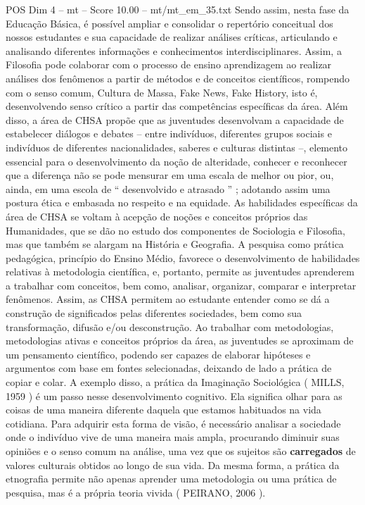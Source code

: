 \begin{textsample}{POS Dim 4 – mt – Score 10.00 – mt/mt\_em\_35.txt}
Sendo assim, nesta fase da Educação Básica, é possível ampliar e consolidar o repertório conceitual dos nossos estudantes e sua capacidade de realizar análises críticas, articulando e analisando diferentes informações e conhecimentos interdisciplinares.
Assim, a Filosofia pode colaborar com o processo de ensino aprendizagem ao realizar análises dos fenômenos a partir de métodos e de conceitos científicos, rompendo com o senso comum, Cultura de Massa, Fake News, Fake History, isto é, desenvolvendo senso crítico a partir das competências específicas da área.
Além disso, a área de CHSA propõe que as juventudes desenvolvam a capacidade de estabelecer diálogos e debates – entre indivíduos, diferentes grupos sociais e indivíduos de diferentes nacionalidades, saberes e culturas distintas –, elemento essencial para o desenvolvimento da noção de alteridade, conhecer e reconhecer que a diferença não se pode mensurar em uma escala de melhor ou pior, ou, ainda, em uma escola de “ desenvolvido e atrasado ” ; adotando assim uma postura ética e embasada no respeito e na equidade.
As habilidades específicas da área de CHSA se voltam à acepção de noções e conceitos próprios das Humanidades, que se dão no estudo dos componentes de Sociologia e Filosofia, mas que também se alargam na História e Geografia.
A pesquisa como prática pedagógica, princípio do Ensino Médio, favorece o desenvolvimento de habilidades relativas à metodologia científica, e, portanto, permite as juventudes aprenderem a trabalhar com conceitos, bem como, analisar, organizar, comparar e interpretar fenômenos.
Assim, as CHSA permitem ao estudante entender como se dá a construção de significados pelas diferentes sociedades, bem como sua transformação, difusão e/ou desconstrução.
Ao trabalhar com metodologias, metodologias ativas e conceitos próprios da área, as juventudes se aproximam de um pensamento científico, podendo ser capazes de elaborar hipóteses e argumentos com base em fontes selecionadas, deixando de lado a prática de copiar e colar.
A exemplo disso, a prática da Imaginação Sociológica ( MILLS, 1959 ) é um passo nesse desenvolvimento cognitivo.
Ela significa olhar para as coisas de uma maneira diferente daquela que estamos habituados na vida cotidiana.
Para adquirir esta forma de visão, é necessário analisar a sociedade onde o indivíduo vive de uma maneira mais ampla, procurando diminuir suas opiniões e o senso comum na análise, uma vez que os sujeitos são \textbf{carregados} de valores culturais obtidos ao longo de sua vida.
Da mesma forma, a prática da etnografia permite não apenas aprender uma metodologia ou uma prática de pesquisa, mas é a própria teoria vivida ( PEIRANO, 2006 ).

\end{textsample}
